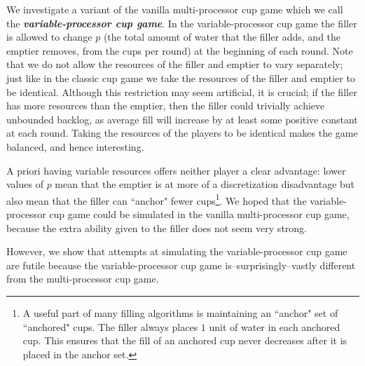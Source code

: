 \documentclass[twocolumn]{article}[10pt]
\newcommand{\defn}[1]{{\textit{\textbf{\boldmath #1}}}\xspace}
\renewcommand{\paragraph}[1]{\vspace{0.09in}\noindent{\bf \boldmath #1.}}
\begin{document}
\paragraph{Our Variant}
We investigate a variant of the vanilla multi-processor cup game which we call
the \defn{variable-processor cup game}. In the variable-processor cup game the
filler is allowed to change $p$ (the total amount of water that the filler
adds, and the emptier removes, from the cups per round) at the beginning of
each round. Note that we do not allow the resources of the filler and emptier
to vary separately; just like in the classic cup game we take the resources of
the filler and emptier to be identical.
Although this restriction may seem artificial, it is crucial; if
the filler has more resources than the emptier, then
the filler could trivially achieve unbounded backlog, as average fill will
increase by at least some positive constant at each round.
Taking the resources of the players to be identical makes the game balanced,
and hence interesting.

A priori having variable resources offers neither player a clear advantage:
lower values of $p$ mean that the emptier is at more of a discretization
disadvantage but also mean that the filler can ``anchor" fewer cups\footnote{A
useful part of many filling algorithms is maintaining an ``anchor" set of
``anchored" cups. The filler always places $1$ unit of water in each anchored
cup. This ensures that the fill of an anchored cup never decreases after it is
placed in the anchor set.}. We hoped that the variable-processor cup game could
be simulated in the vanilla multi-processor cup game, because the extra
ability given to the filler does not seem very strong. 

However, we show that attempts at simulating the variable-processor cup
game are futile because the variable-processor cup game
is--surprisingly--vastly different from the multi-processor cup game. 
\end{document}
